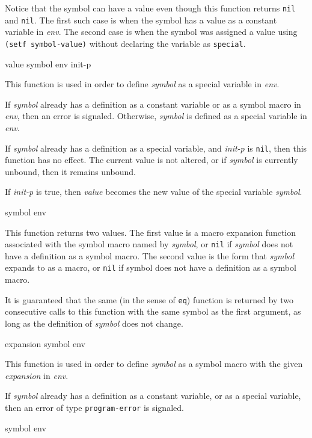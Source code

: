 Notice that the symbol can have a value even though this function
returns \texttt{nil} and \texttt{nil}.  The first such case is when the symbol has a
value as a constant variable in \textit{env}.  The second case is when
the symbol was assigned a value using \texttt{(setf symbol-value)}
without declaring the variable as \texttt{special}.

 {value symbol env init-p}

This function is used in order to define \textit{symbol} as a special
variable in \textit{env}.

If \textit{symbol} already has a definition as a constant variable or as a
symbol macro in \textit{env}, then an error is signaled.
Otherwise, \textit{symbol} is defined as a special variable in \textit{env}.

If \textit{symbol} already has a definition as a special variable, and
\textit{init-p} is \texttt{nil}, then this function has no effect.  The
current value is not altered, or if \textit{symbol} is currently
unbound, then it remains unbound.

If \textit{init-p} is true, then \textit{value} becomes the new
value of the special variable \textit{symbol}.

 {symbol env}

This function returns two values.  The first value is a macro
expansion function associated with the symbol macro named by \textit{symbol},
or \texttt{nil} if \textit{symbol} does not have a definition as a symbol
macro.  The second value is the form that \textit{symbol} expands to as a
macro, or \texttt{nil} if symbol does not have a definition as a
symbol macro.

It is guaranteed that the same (in the sense of \texttt{eq}) function
is returned by two consecutive calls to this function with the same
symbol as the first argument, as long as the definition
of \textit{symbol} does not change.

 {expansion symbol env}

This function is used in order to define \textit{symbol} as a symbol macro
with the given \textit{expansion} in \textit{env}.

If \textit{symbol} already has a definition as a constant variable, or
as a special variable, then an error of type \texttt{program-error} is
signaled.

 {symbol env}

